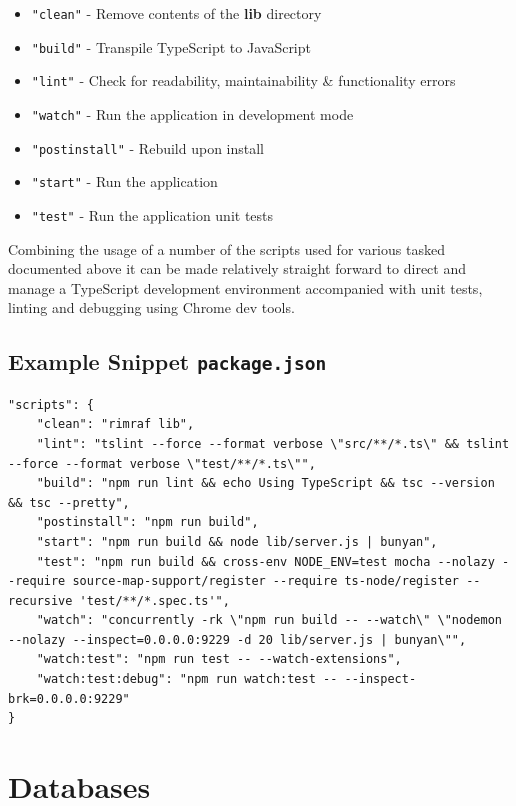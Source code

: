 \begin{itemize}
\item{\texttt{"clean"} - Remove contents of the \textbf{lib} directory}
\item{\texttt{"build"} - Transpile TypeScript to JavaScript}
\item{\texttt{"lint"} - Check for readability, maintainability \& functionality errors}
\item{\texttt{"watch"} - Run the application in development mode}
\item{\texttt{"postinstall"} - Rebuild upon install}
\item{\texttt{"start"} - Run the application}
\item{\texttt{"test"} - Run the application unit tests}
\end{itemize}

Combining the usage of a number of the scripts used for various tasked documented above it can be made relatively straight forward to direct and manage a TypeScript development environment accompanied with unit tests, linting and debugging using Chrome dev tools\cite{nodedebug}. 

\subsection*{Example Snippet \texttt{package.json } }

\begin{verbatim}
"scripts": {
    "clean": "rimraf lib",
    "lint": "tslint --force --format verbose \"src/**/*.ts\" && tslint --force --format verbose \"test/**/*.ts\"",
    "build": "npm run lint && echo Using TypeScript && tsc --version && tsc --pretty",
    "postinstall": "npm run build",
    "start": "npm run build && node lib/server.js | bunyan",
    "test": "npm run build && cross-env NODE_ENV=test mocha --nolazy --require source-map-support/register --require ts-node/register --recursive 'test/**/*.spec.ts'",
    "watch": "concurrently -rk \"npm run build -- --watch\" \"nodemon --nolazy --inspect=0.0.0.0:9229 -d 20 lib/server.js | bunyan\"",
    "watch:test": "npm run test -- --watch-extensions",
    "watch:test:debug": "npm run watch:test -- --inspect-brk=0.0.0.0:9229"
}
\end{verbatim}
\section{Databases}
